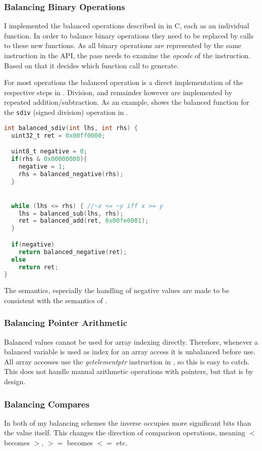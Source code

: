 
\subsubsection{Balancing Binary Operations}
I implemented the balanced operations described in  in C, each as an individual function.
In order to balance binary operations they need to be replaced by calls to these new functions.
As all binary operations are represented by the same instruction in the \llvm{} API, the pass needs to examine the \emph{opcode} of the instruction.
Based on that it decides which function call to generate.

For most operations the balanced operation is a direct implementation of the respective steps in .
Division, and remainder however are implemented by repeated addition/subtraction.
As an example,  shows the balanced function for the \texttt{sdiv} (signed division) operation in \ir{}.

\begin{lstlisting}[language=C, caption=Balanced sdiv, label=lst:sdiv]
int balanced_sdiv(int lhs, int rhs) {
  uint32_t ret = 0x00ff0000;

  uint8_t negative = 0;
  if(rhs & 0x00000080){
    negative = 1;
    rhs = balanced_negative(rhs);
  }


  while (lhs <= rhs) { //~x <= ~y iff x >= y
    lhs = balanced_sub(lhs, rhs);
    ret = balanced_add(ret, 0x00fe0001);
  }

  if(negative)
    return balanced_negative(ret);
  else
    return ret;
}
\end{lstlisting}

The semantics, especially the handling of negative values are made to be consistent with the semantics of \llvm{}.

\subsubsection{Balancing Pointer Arithmetic}
Balanced values cannot be used for array indexing directly.
Therefore, whenever a balanced variable is used as index for an array access it is unbalanced before use.
All array accesses use the \emph{getelementptr} instruction in \ir{}, so this is easy to catch.
This does not handle manual arithmetic operations with pointers, but that is by design.

\subsubsection{Balancing Compares}
In both of my balancing schemes the inverse occupies more significant bits than the value itself.
This changes the direction of comparison operations, meaning $<$ becomes $>$, $>=$ becomes $<=$ etc.
